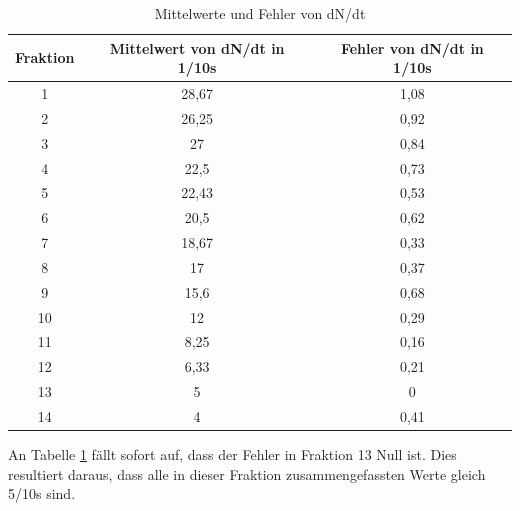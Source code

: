 \begin{table}
\begin{tabular}{|c|c|c|}

\hline
Fraktion	&Mittelwert von dN/dt in 1/10s	&Fehler von dN/dt in 1/10s \\
\hline
1		&28,67				&1,08\\
\hline
2		&26,25				&0,92\\
\hline
3		&27					&0,84\\
\hline
4		&22,5				&0,73\\
\hline
5		&22,43				&0,53\\
\hline
6		&20,5				&0,62\\
\hline
7		&18,67				&0,33\\
\hline
8		&17					&0,37\\
\hline
9		&15,6				&0,68\\
\hline
10		&12					&0,29\\
\hline
11		&8,25				&0,16\\
\hline
12		&6,33				&0,21\\
\hline
13		&5					&0\\
\hline
14		&4					&0,41\\
\hline
\end{tabular}
\caption{Mittelwerte und Fehler von dN/dt}
\label{tbl_3}
\end{table}


An Tabelle \ref{tbl_3} fällt sofort auf, dass der Fehler in Fraktion 13 Null ist. Dies resultiert daraus, dass alle in dieser Fraktion zusammengefassten Werte gleich 5/10s sind.

